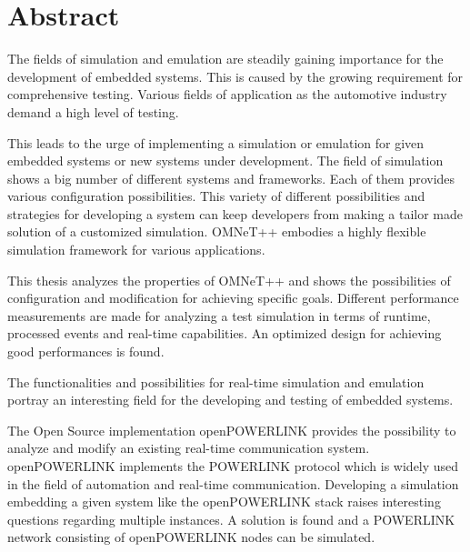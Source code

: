 \chapter{Abstract}

The fields of simulation and emulation are steadily gaining importance for the development of embedded systems.
This is caused by the growing requirement for comprehensive testing.
Various fields of application as the automotive industry demand a high level of testing.

This leads to the urge of implementing a simulation or emulation for given embedded systems or new systems under development.
The field of simulation shows a big number of different systems and frameworks.
Each of them provides various configuration possibilities.
This variety of different possibilities and strategies for developing a system can keep developers from making a tailor made solution of a customized simulation.
OMNeT++ embodies a highly flexible simulation framework for various applications.

This thesis analyzes the properties of OMNeT++ and shows the possibilities of configuration and modification for achieving specific goals.
Different performance measurements are made for analyzing a test simulation in terms of runtime, processed events and real-time capabilities.
An optimized design for achieving good performances is found.

The functionalities and possibilities for real-time simulation and emulation portray an interesting field for the developing and testing of embedded systems.

The Open Source implementation openPOWERLINK provides the possibility to analyze and modify an existing real-time communication system.
openPOWERLINK implements the POWERLINK protocol which is widely used in the field of automation and real-time communication.
Developing a simulation embedding a given system like the openPOWERLINK stack raises interesting questions regarding multiple instances.
A solution is found and a POWERLINK network consisting of openPOWERLINK nodes can be simulated.
